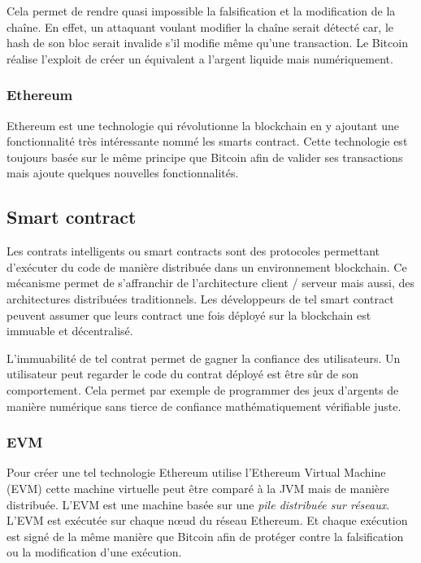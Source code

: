 Cela permet de rendre quasi impossible la falsification et la modification de la chaîne. En effet, un attaquant voulant modifier la chaîne serait
détecté car, le hash de son bloc serait invalide s'il modifie même qu'une transaction. Le Bitcoin réalise l'exploit de créer un équivalent a l'argent
liquide mais numériquement.

\subsubsection{Ethereum}

Ethereum est une technologie qui révolutionne la blockchain en y ajoutant une fonctionnalité très intéressante nommé les smarts contract. Cette
technologie est toujours basée sur le même principe que Bitcoin afin de valider ses transactions mais ajoute quelques nouvelles fonctionnalités.

\subsection{Smart contract}

Les contrats intelligents ou smart contracts sont des protocoles permettant d'exécuter du code de manière distribuée dans un environnement blockchain.
Ce mécanisme permet de s'affranchir de l'architecture client / serveur mais aussi, des architectures distribuées traditionnels. Les développeurs de
tel smart contract peuvent assumer que leurs contract une fois déployé sur la blockchain est immuable et décentralisé.

L'immuabilité de tel contrat permet de gagner la confiance des utilisateurs. Un utilisateur peut regarder le code du contrat déployé est être sûr 
de son comportement. Cela permet par exemple de programmer des jeux d'argents de manière numérique sans tierce de confiance mathématiquement 
vérifiable juste.

\subsubsection{EVM}

Pour créer une tel technologie Ethereum utilise l'Ethereum Virtual Machine (EVM) cette machine virtuelle peut être comparé à la JVM mais de manière distribuée.
L'EVM est une machine basée sur une \emph{pile distribuée sur réseaux}.
L'EVM est exécutée sur chaque nœud du réseau Ethereum. Et chaque exécution est signé de la même manière que Bitcoin afin de protéger contre la falsification
ou la modification d'une exécution.

